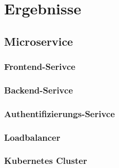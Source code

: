 \chapter{Ergebnisse}
\section{Microservice}
\subsection{Frontend-Serivce}
\subsection{Backend-Serivce}
\subsection{Authentifizierungs-Serivce}
\subsection{Loadbalancer}
\subsection{Kubernetes Cluster}
